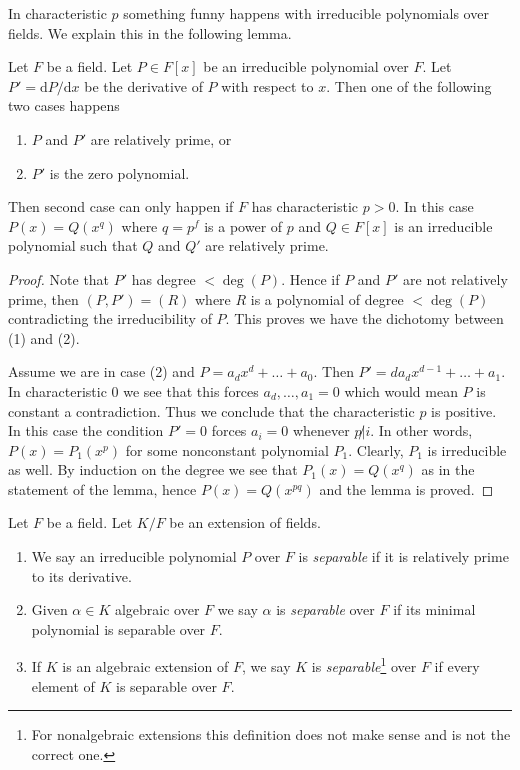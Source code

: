 \noindent
In characteristic $p$ something funny happens with irreducible polynomials
over fields. We explain this in the following lemma.

\begin{lemma}
\label{lemma-irreducible-polynomials}
Let $F$ be a field. Let $P \in F[x]$ be an irreducible polynomial over $F$.
Let $P' = \text{d}P/\text{d}x$ be the derivative of $P$ with respect
to $x$. Then one of the following two cases happens
\begin{enumerate}
\item $P$ and $P'$ are relatively prime, or
\item $P'$ is the zero polynomial.
\end{enumerate}
Then second case can only happen if $F$ has characteristic $p > 0$.
In this case $P(x) = Q(x^q)$ where $q = p^f$ is a power of $p$ and
$Q \in F[x]$ is an irreducible polynomial such that $Q$ and $Q'$
are relatively prime.
\end{lemma}

\begin{proof}
Note that $P'$ has degree $< \deg(P)$. Hence if $P$ and $P'$ are not relatively
prime, then $(P, P') = (R)$ where $R$ is a polynomial of degree $< \deg(P)$
contradicting the irreducibility of $P$. This proves we have the dichotomy
between (1) and (2).

\medskip\noindent
Assume we are in case (2) and $P = a_d x^d + \ldots + a_0$. Then
$P' = da_d x^{d - 1} + \ldots + a_1$. In characteristic $0$ we see
that this forces $a_d, \ldots, a_1 = 0$ which would mean $P$ is constant
a contradiction. Thus we conclude that the characteristic $p$ is positive.
In this case the condition $P' = 0$ forces $a_i = 0$ whenever $p \not | i$.
In other words, $P(x) = P_1(x^p)$ for some nonconstant polynomial $P_1$.
Clearly, $P_1$ is irreducible as well. By induction on the degree we
see that $P_1(x) = Q(x^q)$ as in the statement of the lemma, hence
$P(x) = Q(x^{pq})$ and the lemma is proved.
\end{proof}

\begin{definition}
\label{definition-separable}
Let $F$ be a field. Let $K/F$ be an extension of fields.
\begin{enumerate}
\item We say an irreducible polynomial $P$ over $F$ is {\it separable}
if it is relatively prime to its derivative.
\item Given $\alpha \in K$ algebraic over $F$ we say $\alpha$ is
{\it separable} over $F$ if its minimal polynomial is separable over $F$.
\item If $K$ is an algebraic extension of $F$, we say $K$ is
{\it separable}\footnote{For nonalgebraic extensions
this definition does not make sense and is not the correct one.}
over $F$ if every element of $K$ is separable over $F$.
\end{enumerate}
\end{definition}

